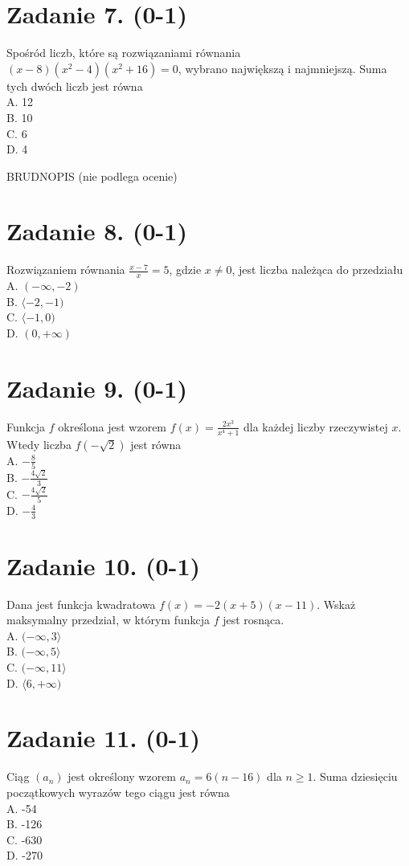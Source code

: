 \documentclass[10pt]{article}
\begin{document}
\section*{Zadanie 7. (0-1)}
Spośród liczb, które są rozwiązaniami równania \((x-8)\left(x^{2}-4\right)\left(x^{2}+16\right)=0\), wybrano największą i najmniejszą. Suma tych dwóch liczb jest równa\\
A. 12\\
B. 10\\
C. 6\\
D. 4

BRUDNOPIS (nie podlega ocenie)\\
\(\qquad\)

\section*{Zadanie 8. (0-1)}
Rozwiązaniem równania \(\frac{x-7}{x}=5\), gdzie \(x \neq 0\), jest liczba należąca do przedziału\\
A. \((-\infty,-2)\)\\
B. \(\langle-2,-1)\)\\
C. \(\langle-1,0)\)\\
D. \((0,+\infty)\)

\section*{Zadanie 9. (0-1)}
Funkcja \(f\) określona jest wzorem \(f(x)=\frac{2 x^{3}}{x^{4}+1}\) dla każdej liczby rzeczywistej \(x\). Wtedy liczba \(f(-\sqrt{2})\) jest równa\\
A. \(-\frac{8}{5}\)\\
B. \(-\frac{4 \sqrt{2}}{3}\)\\
C. \(-\frac{4 \sqrt{2}}{5}\)\\
D. \(-\frac{4}{3}\)

\section*{Zadanie 10. (0-1)}
Dana jest funkcja kwadratowa \(f(x)=-2(x+5)(x-11)\). Wskaż maksymalny przedział, w którym funkcja \(f\) jest rosnąca.\\
A. \((-\infty, 3\rangle\)\\
B. \((-\infty, 5\rangle\)\\
C. \((-\infty, 11\rangle\)\\
D. \(\langle 6,+\infty)\)

\section*{Zadanie 11. (0-1)}
Ciąg \(\left(a_{n}\right)\) jest określony wzorem \(a_{n}=6(n-16)\) dla \(n \geq 1\). Suma dziesięciu początkowych wyrazów tego ciągu jest równa\\
A. -54\\
B. -126\\
C. -630\\
D. -270
\end{document}
